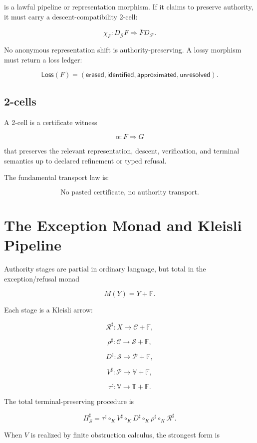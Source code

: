 \documentclass[11pt]{article}
\begin{document}
is a lawful pipeline or representation morphism. If it claims to preserve authority, it must carry a descent-compatibility 2-cell:

\[
\boxed{
\chi_F:D_{\mathcal G}F\Rightarrow \bar F D_{\mathcal F}.
}
\]

No anonymous representation shift is authority-preserving. A lossy morphism must return a loss ledger:

\[
\mathsf{Loss}(F)
=
(
\mathsf{erased},
\mathsf{identified},
\mathsf{approximated},
\mathsf{unresolved}
).
\]

\subsection{2-cells}

A 2-cell is a certificate witness

\[
\alpha:F\Rightarrow G
\]

that preserves the relevant representation, descent, verification, and terminal semantics up to declared refinement or typed refusal.

The fundamental transport law is:

\[
\boxed{
\text{No pasted certificate, no authority transport.}
}
\]

\section{The Exception Monad and Kleisli Pipeline}

Authority stages are partial in ordinary language, but total in the exception/refusal monad

\[
M(Y)=Y+\mathbb F.
\]

Each stage is a Kleisli arrow:

\[
\mathcal R^\sharp:X\to \mathcal C+\mathbb F,
\]

\[
\rho^\sharp:\mathcal C\to\mathcal S+\mathbb F,
\]

\[
D^\sharp:\mathcal S\to\mathcal P+\mathbb F,
\]

\[
V^\sharp:\mathcal P\to\mathbb V+\mathbb F,
\]

\[
\tau^\sharp:\mathbb V\to\mathbb T+\mathbb F.
\]

The total terminal-preserving procedure is

\[
\boxed{
\Pi_S^\sharp
=
\tau^\sharp\circ_K V^\sharp\circ_K D^\sharp\circ_K \rho^\sharp\circ_K \mathcal R^\sharp.
}
\]

When \(V\) is realized by finite obstruction calculus, the strongest form is
\end{document}
